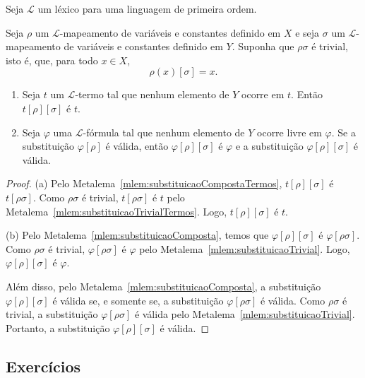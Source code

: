 \begin{metalemma}\label{mlem:substituicaoInversaEmFormulas}
    Seja $\mathcal L$ um léxico para uma linguagem de primeira ordem.

    Seja $\rho$ um $\mathcal L$-mapeamento de variáveis e constantes definido em $X$ e seja $\sigma$ um $\mathcal L$-mapeamento de variáveis e constantes definido em $Y$.
    Suponha que $\rho\sigma$ é trivial, isto é, que, para todo $x\in X$,
    \[
        \rho(x)[\sigma]=x.
    \]

    \begin{enumerate}
        \item Seja $t$ um $\mathcal L$-termo tal que nenhum elemento de $Y$ ocorre em $t$.
        Então $t[\rho][\sigma]$ é $t$.

        \item Seja $\varphi$ uma $\mathcal L$-fórmula tal que nenhum elemento de $Y$ ocorre livre em $\varphi$.
        Se a substituição $\varphi[\rho]$ é válida, então $\varphi[\rho][\sigma]$ é $\varphi$ e a substituição $\varphi[\rho][\sigma]$ é válida.
    \end{enumerate}
\end{metalemma}
\begin{proof}
    (a) Pelo Metalema~\ref{mlem:substituicaoCompostaTermos}, $t[\rho][\sigma]$ é $t[\rho\sigma]$.
    Como $\rho\sigma$ é trivial, $t[\rho\sigma]$ é $t$ pelo Metalema~\ref{mlem:substituicaoTrivialTermos}.
    Logo, $t[\rho][\sigma]$ é $t$.

    (b) Pelo Metalema~\ref{mlem:substituicaoComposta}, temos que $\varphi[\rho][\sigma]$ é $\varphi[\rho\sigma]$.
    Como $\rho\sigma$ é trivial, $\varphi[\rho\sigma]$ é $\varphi$ pelo Metalema~\ref{mlem:substituicaoTrivial}.
    Logo, $\varphi[\rho][\sigma]$ é $\varphi$.

    Além disso, pelo Metalema~\ref{mlem:substituicaoComposta}, a substituição $\varphi[\rho][\sigma]$ é válida se, e somente se, a substituição $\varphi[\rho\sigma]$ é válida.
    Como $\rho\sigma$ é trivial, a substituição $\varphi[\rho\sigma]$ é válida pelo Metalema~\ref{mlem:substituicaoTrivial}.
    Portanto, a substituição $\varphi[\rho][\sigma]$ é válida.
\end{proof}
\subsection*{Exercícios}

